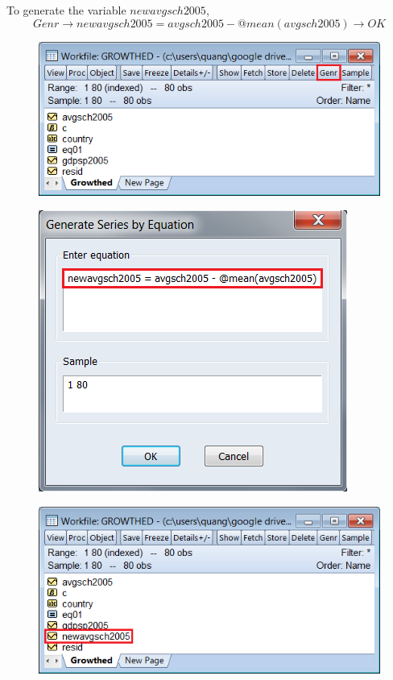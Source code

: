 \documentclass[12pt]{report}
\begin{document}
\noindent To generate the variable $newavgsch2005$, $$Genr \to newavgsch2005 = avgsch2005 - @mean(avgsch2005) \to OK$$
\begin{figure}[H]
	\centering
	\includegraphics{tute6_q4_3}
\end{figure}
\vspace{-\baselineskip}
\begin{figure}[H]
	\centering
	\includegraphics{tute6_q4_4}
\end{figure}
\vspace{-\baselineskip}
\begin{figure}[H]
	\centering
	\includegraphics{tute6_q4_5}
\end{figure}
\end{document}
